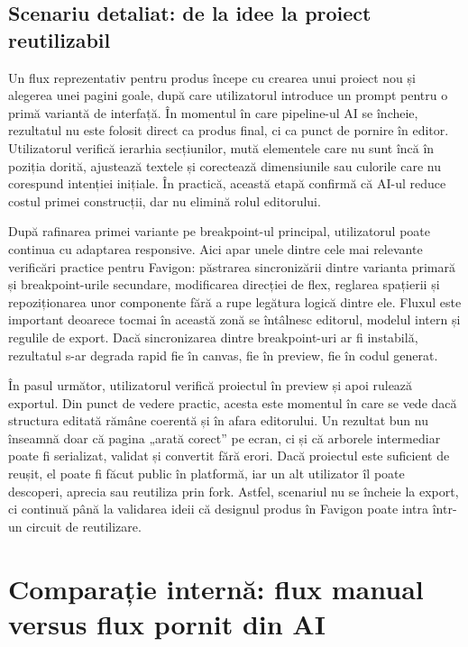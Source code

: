 \subsection{Scenariu detaliat: de la idee la proiect reutilizabil}

Un flux reprezentativ pentru produs începe cu crearea unui proiect nou și alegerea unei pagini goale, după care utilizatorul introduce un prompt pentru o primă variantă de interfață. În momentul în care pipeline-ul AI se încheie, rezultatul nu este folosit direct ca produs final, ci ca punct de pornire în editor. Utilizatorul verifică ierarhia secțiunilor, mută elementele care nu sunt încă în poziția dorită, ajustează textele și corectează dimensiunile sau culorile care nu corespund intenției inițiale. În practică, această etapă confirmă că AI-ul reduce costul primei construcții, dar nu elimină rolul editorului.

După rafinarea primei variante pe breakpoint-ul principal, utilizatorul poate continua cu adaptarea responsive. Aici apar unele dintre cele mai relevante verificări practice pentru Favigon: păstrarea sincronizării dintre varianta primară și breakpoint-urile secundare, modificarea direcției de flex, reglarea spațierii și repoziționarea unor componente fără a rupe legătura logică dintre ele. Fluxul este important deoarece tocmai în această zonă se întâlnesc editorul, modelul intern și regulile de export. Dacă sincronizarea dintre breakpoint-uri ar fi instabilă, rezultatul s-ar degrada rapid fie în canvas, fie în preview, fie în codul generat.

În pasul următor, utilizatorul verifică proiectul în preview și apoi rulează exportul. Din punct de vedere practic, acesta este momentul în care se vede dacă structura editată rămâne coerentă și în afara editorului. Un rezultat bun nu înseamnă doar că pagina „arată corect” pe ecran, ci și că arborele intermediar poate fi serializat, validat și convertit fără erori. Dacă proiectul este suficient de reușit, el poate fi făcut public în platformă, iar un alt utilizator îl poate descoperi, aprecia sau reutiliza prin fork. Astfel, scenariul nu se încheie la export, ci continuă până la validarea ideii că designul produs în Favigon poate intra într-un circuit de reutilizare.

\section{Comparație internă: flux manual versus flux pornit din AI}

